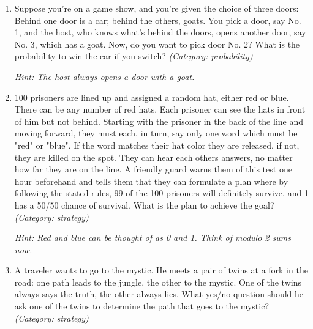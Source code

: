 \begin{enumerate}




\item Suppose you're on a game show, and you're given the choice of three doors: Behind one door is a car; behind the others, goats. You pick a door, say No. 1, and the host, who knows what's behind the doors, opens another door, say No. 3, which has a goat. Now, do you want to pick door No. 2? What is the probability to win the car if you switch?
\small\emph{(Category: probability)}

\small\emph{Hint: The host always opens a door with a goat.}





\item 100 prisoners are lined up and assigned a random hat, either red or blue. There can be any number of red hats. Each prisoner can see the hats in front of him but not behind. Starting with the prisoner in the back of the line and moving forward, they must each, in turn, say only one word which must be "red" or "blue". If the word matches their hat color they are released, if not, they are killed on the spot. They can hear each others answers, no matter how far they are on the line. A friendly guard warns them of this test one hour beforehand and tells them that they can formulate a plan where by following the stated rules, 99 of the 100 prisoners will definitely survive, and 1 has a 50/50 chance of survival. What is the plan to achieve the goal?
\small\emph{(Category: strategy)}

\small\emph{Hint: Red and blue can be thought of as 0 and 1. Think of modulo 2 sums now.}





\item A traveler wants to go to the mystic. He meets a pair of twins at a fork in the road: one path leads to the jungle, the other to the mystic. One of the twins always says the truth, the other always lies. What yes/no question should he ask one of the twins to determine the path that goes to the mystic?
\small\emph{(Category: strategy)}


\end{enumerate}
